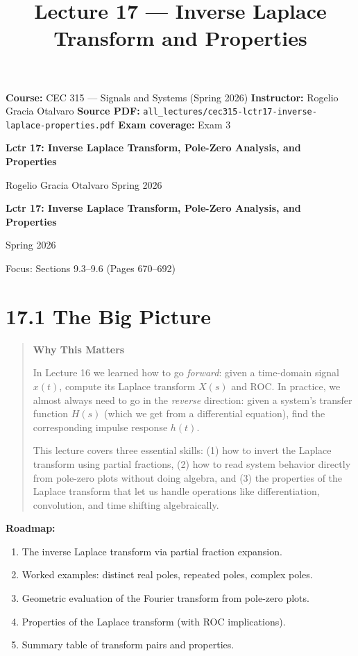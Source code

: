 \documentclass[11pt]{article}
\title{Lecture 17 — Inverse Laplace Transform and Properties}
\author{}
\date{}
\begin{document}
\maketitle

\textbf{Course:} CEC 315 — Signals and Systems (Spring 2026)
\textbf{Instructor:} Rogelio Gracia Otalvaro
\textbf{Source PDF:} \texttt{all\_lectures/cec315-lctr17-inverse-laplace-properties.pdf}
\textbf{Exam coverage:} Exam 3

\textbf{Lctr 17: Inverse Laplace Transform, Pole-Zero Analysis, and Properties}

Rogelio Gracia Otalvaro
Spring 2026

\textbf{Lctr 17: Inverse Laplace Transform, Pole-Zero Analysis, and Properties}

Spring 2026

Focus: Sections 9.3–9.6 (Pages 670–692)

\section*{17.1 The Big Picture}

\begin{quote}
\textbf{Why This Matters}

In Lecture 16 we learned how to go \textit{forward}: given a time-domain signal $x(t)$, compute its Laplace transform $X(s)$ and ROC. In practice, we almost always need to go in the \textit{reverse} direction: given a system's transfer function $H(s)$ (which we get from a differential equation), find the corresponding impulse response $h(t)$.

This lecture covers three essential skills: (1) how to invert the Laplace transform using partial fractions, (2) how to read system behavior directly from pole-zero plots without doing algebra, and (3) the properties of the Laplace transform that let us handle operations like differentiation, convolution, and time shifting algebraically.
\end{quote}

\textbf{Roadmap:}

\begin{enumerate}
  \item The inverse Laplace transform via partial fraction expansion.
  \item Worked examples: distinct real poles, repeated poles, complex poles.
  \item Geometric evaluation of the Fourier transform from pole-zero plots.
  \item Properties of the Laplace transform (with ROC implications).
  \item Summary table of transform pairs and properties.
\end{enumerate}
\end{document}
